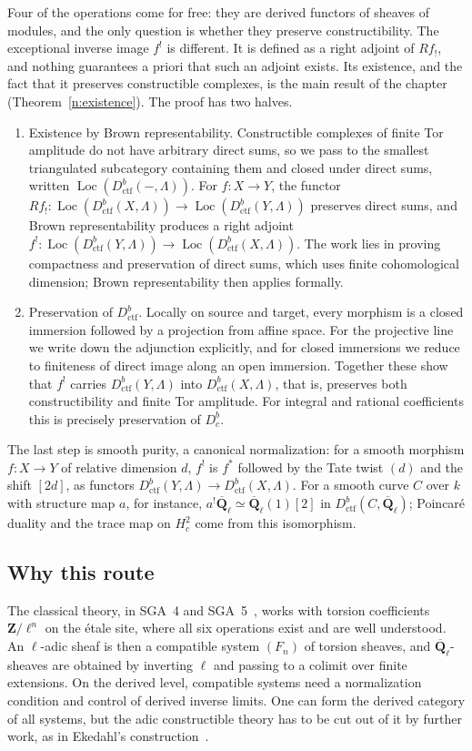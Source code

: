 \documentclass[11pt,a4paper]{article}
\numberwithin{equation}{section}
\theoremstyle{definition}
\theoremstyle{remark}
\newcommand{\Dbc}{D^b_c}
\newcommand{\Loc}{\operatorname{Loc}}
\newcommand{\Qbar}{\overline{\mathbf Q}_\ell}
\newcommand{\Dctf}{D^b_{\mathrm{ctf}}}
\begin{document}
Four of the operations come for free: they are derived functors of
sheaves of modules, and the only question is whether they preserve
constructibility. The exceptional inverse image $f^!$ is different. It
is defined as a right adjoint of $Rf_!$, and nothing guarantees a priori
that such an adjoint exists. Its existence, and the fact that it
preserves constructible complexes, is the main result of the chapter
(Theorem~\ref{n:existence}). The proof has two halves.
\begin{enumerate}[label=(\Alph*)]
\item Existence by Brown representability. Constructible complexes of finite
  Tor amplitude do not have arbitrary direct sums, so we pass to the
  smallest triangulated subcategory containing them and closed under
  direct sums, written $\Loc(\Dctf(-,\Lambda))$. For $f\colon X\to Y$,
  the functor
  $Rf_!\colon\Loc(\Dctf(X,\Lambda))\to\Loc(\Dctf(Y,\Lambda))$ preserves
  direct sums, and Brown representability produces a right adjoint
  $f^!\colon\Loc(\Dctf(Y,\Lambda))\to\Loc(\Dctf(X,\Lambda))$. The
  work lies in proving compactness and preservation of direct sums,
  which uses finite cohomological dimension; Brown representability
  then applies formally.
\item Preservation of $\Dctf$. Locally on
  source and target, every morphism is a closed immersion followed by a
  projection from affine space. For the projective line we write down
  the adjunction explicitly, and for closed immersions we reduce to
  finiteness of direct image along an open immersion. Together these
  show that $f^!$ carries $\Dctf(Y,\Lambda)$ into $\Dctf(X,\Lambda)$,
  that is, preserves both constructibility and finite Tor
  amplitude. For integral and rational coefficients this is precisely
  preservation of $\Dbc$.
\end{enumerate}
The last step is smooth purity, a canonical normalization: for a smooth
morphism $f\colon X\to Y$ of relative dimension $d$, $f^!$ is $f^*$
followed by the Tate twist $(d)$ and the shift $[2d]$, as functors
$\Dctf(Y,\Lambda)\to\Dctf(X,\Lambda)$. For a smooth curve $C$ over $k$
with structure map $a$, for instance, $a^!\Qbar\simeq\Qbar(1)[2]$ in
$\Dctf(C,\Qbar)$;
Poincar\'e duality and the trace map on $H^2_c$ come from this
isomorphism.

\subsection{Why this route}
The classical theory, in SGA~4 and SGA~5~\cite{SGA4,SGA5}, works with
torsion coefficients $\mathbf Z/\ell^n$ on the \'etale site, where all
six operations exist and are well understood. An $\ell$-adic sheaf is
then a compatible system $(F_n)$ of torsion sheaves, and
$\Qbar$-sheaves are obtained by inverting $\ell$ and passing to a
colimit over finite extensions. On the derived level, compatible
systems need a normalization condition and control of derived inverse
limits. One can form the derived category of all systems, but the adic
constructible theory has to be cut out of it by further work, as in
Ekedahl's construction~\cite{Ekedahl}.
\end{document}
